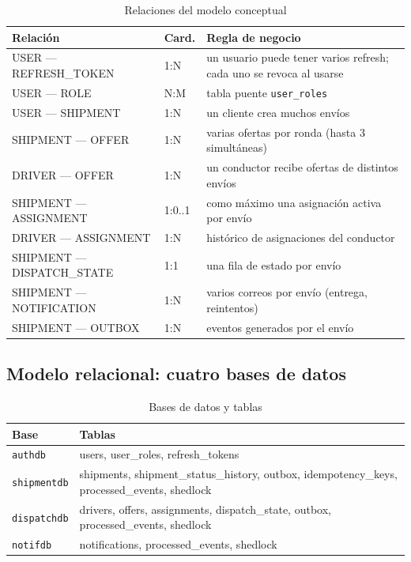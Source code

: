 \documentclass[conference]{IEEEtran}
\newcommand{\pkg}[1]{\texttt{#1}}
\begin{document}
\begin{table}[t]
\centering
\caption{Relaciones del modelo conceptual}
\small
\begin{tabular}{@{}L{4.6cm}L{1.6cm}L{6.6cm}@{}}
\toprule
\textbf{Relación} & \textbf{Card.} & \textbf{Regla de negocio}\\
\midrule
USER — REFRESH\_TOKEN & 1:N & un usuario puede tener varios refresh; cada uno se revoca al usarse\\
USER — ROLE & N:M & tabla puente \pkg{user\_roles}\\
USER — SHIPMENT & 1:N & un cliente crea muchos envíos\\
SHIPMENT — OFFER & 1:N & varias ofertas por ronda (hasta 3 simultáneas)\\
DRIVER — OFFER & 1:N & un conductor recibe ofertas de distintos envíos\\
SHIPMENT — ASSIGNMENT & 1:0..1 & como máximo una asignación activa por envío\\
DRIVER — ASSIGNMENT & 1:N & histórico de asignaciones del conductor\\
SHIPMENT — DISPATCH\_STATE & 1:1 & una fila de estado por envío\\
SHIPMENT — NOTIFICATION & 1:N & varios correos por envío (entrega, reintentos)\\
SHIPMENT — OUTBOX & 1:N & eventos generados por el envío\\
\bottomrule
\end{tabular}
\end{table}

\subsection{Modelo relacional: cuatro bases de datos}

\begin{table}[t]
\centering
\caption{Bases de datos y tablas}
\small
\begin{tabular}{@{}L{2.6cm}L{11.4cm}@{}}
\toprule
\textbf{Base} & \textbf{Tablas}\\
\midrule
\pkg{authdb} & users, user\_roles, refresh\_tokens\\
\pkg{shipmentdb} & shipments, shipment\_status\_history, outbox, idempotency\_keys,
processed\_events, shedlock\\
\pkg{dispatchdb} & drivers, offers, assignments, dispatch\_state, outbox, processed\_events, shedlock\\
\pkg{notifdb} & notifications, processed\_events, shedlock\\
\bottomrule
\end{tabular}
\end{table}
\end{document}

